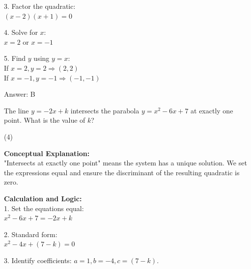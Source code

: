 \documentclass[11pt,paper=a4,answers]{exam}
\begin{document}
\begin{questions}
\begin{solution}
\vspace{10pt}

3. Factor the quadratic: \\
   $(x - 2)(x + 1) = 0$

\vspace{10pt}

4. Solve for $x$: \\
   $x = 2$ or $x = -1$

\vspace{10pt}

5. Find $y$ using $y = x$: \\
   If $x = 2, y = 2 \Rightarrow (2, 2)$ \\
   If $x = -1, y = -1 \Rightarrow (-1, -1)$

\vspace{25pt}

Answer: \colorbox{yellow!100}{B}
\end{solution}

\vspace{40pt}

\question
The line $y = -2x + k$ intersects the parabola $y = x^2 - 6x + 7$ at exactly one point. What is the value of $k$?
\begin{tasks}(4)
\end{tasks}

\begin{solution}
\textbf{Conceptual Explanation:} \\
"Intersects at exactly one point" means the system has a unique solution. We set the expressions equal and ensure the discriminant of the resulting quadratic is zero.

\vspace{20pt}

\textbf{Calculation and Logic:} \\
1. Set the equations equal: \\
   $x^2 - 6x + 7 = -2x + k$

\vspace{10pt}

2. Standard form: \\
   $x^2 - 4x + (7 - k) = 0$

\vspace{10pt}

3. Identify coefficients: $a = 1, b = -4, c = (7 - k)$.

\vspace{10pt}


\end{solution}
\end{questions}
\end{document}
